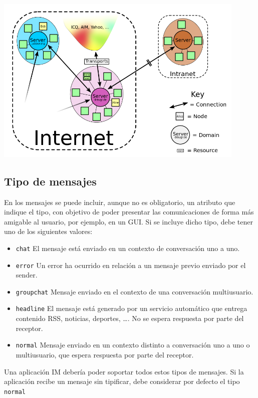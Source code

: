 \documentclass[a4paper, 11pt]{article} %
\begin{document}
      \begin{center}
      \includegraphics[width=12cm]{network.png}
      \end{center}
      
    
  
  \subsection{Tipo de mensajes}
    En los mensajes se puede incluir, aunque no es obligatorio, un atributo que indique el tipo, con objetivo de poder
    presentar las comunicaciones de forma más amigable al usuario, por ejemplo, en un GUI. Si se incluye dicho tipo, debe
    tener uno de los siguientes valores:
    \begin{itemize}
     \item \texttt{chat} El mensaje está enviado en un contexto de conversación uno a uno.
     \item \texttt{error} Un error ha ocurrido en relación a un mensaje previo enviado por el sender.
     \item \texttt{groupchat} Mensaje enviado en el contexto de una conversación multiusuario.
     \item \texttt{headline} El mensaje está generado por un servicio automático que entrega contenido RSS, noticias, 
     deportes, \ldots. No se espera respuesta por parte del receptor.
     \item \texttt{normal} Mensaje enviado en un contexto distinto a conversación uno a uno o multiusuario, que espera
     respuesta por parte del receptor.
    \end{itemize}
    Una aplicación IM debería poder soportar todos estos tipos de mensajes. Si la aplicación recibe un mensaje sin tipificar,
    debe considerar por defecto el tipo \texttt{normal}  
  
\end{document}
